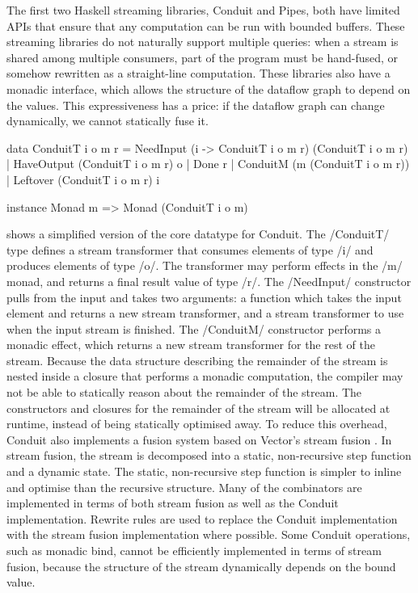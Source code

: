 The first two Haskell streaming libraries, Conduit and Pipes, both have limited APIs that ensure that any computation can be run with bounded buffers.
These streaming libraries do not naturally support multiple queries: when a stream is shared among multiple consumers, part of the program must be hand-fused, or somehow rewritten as a straight-line computation.
These libraries also have a monadic interface, which allows the structure of the dataflow graph to depend on the values.
This expressiveness has a price: if the dataflow graph can change dynamically, we cannot statically fuse it.

\begin{haskell}[float,caption=Conduit datatypes,label=l:bench:def:conduit]
data ConduitT i o m r =
    NeedInput  (i -> ConduitT i o m r) (ConduitT i o m r)
  | HaveOutput (ConduitT i o m r) o
  | Done r
  | ConduitM   (m (ConduitT i o m r))
  | Leftover   (ConduitT i o m r) i

instance Monad m => Monad (ConduitT i o m)
\end{haskell}

 shows a simplified version of the core datatype for Conduit.
The \Hs/ConduitT/ type defines a stream transformer that consumes elements of type \Hs/i/ and produces elements of type \Hs/o/.
The transformer may perform effects in the \Hs/m/ monad, and returns a final result value of type \Hs/r/.
The \Hs/NeedInput/ constructor pulls from the input and takes two arguments: a function which takes the input element and returns a new stream transformer, and a stream transformer to use when the input stream is finished.
The \Hs/ConduitM/ constructor performs a monadic effect, which returns a new stream transformer for the rest of the stream.
Because the data structure describing the remainder of the stream is nested inside a closure that performs a monadic computation, the compiler may not be able to statically reason about the remainder of the stream.
The constructors and closures for the remainder of the stream will be allocated at runtime, instead of being statically optimised away.
To reduce this overhead, Conduit also implements a fusion system based on Vector's stream fusion \citep{coutts2007stream}.
In stream fusion, the stream is decomposed into a static, non-recursive step function and a dynamic state.
The static, non-recursive step function is simpler to inline and optimise than the recursive structure.
Many of the combinators are implemented in terms of both stream fusion as well as the Conduit implementation.
Rewrite rules are used to replace the Conduit implementation with the stream fusion implementation where possible.
Some Conduit operations, such as monadic bind, cannot be efficiently implemented in terms of stream fusion, because the structure of the stream dynamically depends on the bound value.

